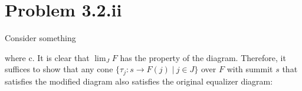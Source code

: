\documentclass{book}
\begin{document}
\section{Problem 3.2.ii}
Consider something


where c.
It is clear that $\lim_{J} F$ has the property of the diagram. Therefore, it suffices to show that any cone $\{\tau_j:s\rightarrow F(j) \; | \: j\in J\}$ over $F$ with summit $s$ that satisfies the modified diagram also satisfies the original equalizer diagram:
\end{document}

